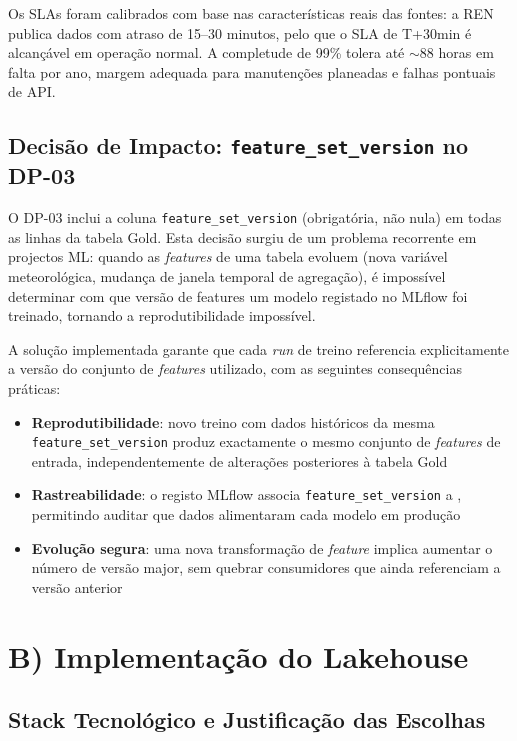 \documentclass[11pt,a4paper]{article}
\begin{document}
Os SLAs foram calibrados com base nas características reais das fontes: a REN publica dados com atraso de 15--30 minutos, pelo que o SLA de T+30min é alcançável em operação normal. A completude de 99\% tolera até $\sim$88 horas em falta por ano, margem adequada para manutenções planeadas e falhas pontuais de API.

\subsection{Decisão de Impacto: \texttt{feature\_set\_version} no DP-03}

O DP-03 inclui a coluna \texttt{feature\_set\_version} (obrigatória, não nula) em todas as linhas da tabela Gold. Esta decisão surgiu de um problema recorrente em projectos ML: quando as \textit{features} de uma tabela evoluem (nova variável meteorológica, mudança de janela temporal de agregação), é impossível determinar com que versão de features um modelo registado no MLflow foi treinado, tornando a reprodutibilidade impossível.

A solução implementada garante que cada \textit{run} de treino referencia explicitamente a versão do conjunto de \textit{features} utilizado, com as seguintes consequências práticas:

\begin{itemize}[leftmargin=*,noitemsep]
  \item \textbf{Reprodutibilidade}: novo treino com dados históricos da mesma \texttt{feature\_set\_version} produz exactamente o mesmo conjunto de \textit{features} de entrada, independentemente de alterações posteriores à tabela Gold
  \item \textbf{Rastreabilidade}: o registo MLflow associa \texttt{feature\_set\_version} a , permitindo auditar que dados alimentaram cada modelo em produção
  \item \textbf{Evolução segura}: uma nova transformação de \textit{feature} implica aumentar o número de versão major, sem quebrar consumidores que ainda referenciam a versão anterior
\end{itemize}

\section{B) Implementação do Lakehouse}

\subsection{Stack Tecnológico e Justificação das Escolhas}
\end{document}
